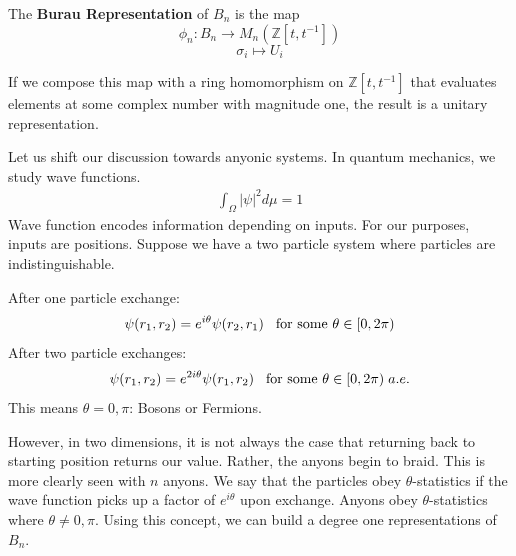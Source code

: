 \documentclass[compress,aspectratio=169,10pt,usenames,dvipsnames]{beamer}
\newcommand{\Z}{\mathbb{Z}}
\begin{document}
\begin{frame}
\vfill
\begin{definition}
	The \textbf{Burau Representation} of $B_n$ is the map 
$$\phi_n:B_n\rightarrow M_n(\Z[t,t^{-1}])$$
$$\sigma_i \mapsto U_i$$
\end{definition}
\vfill
If we compose this map with a ring homomorphism on $\Z[t,t^{-1}]$ that evaluates elements at some complex number with magnitude one, the result is a unitary representation.
\end{frame}
%
%
\begin{frame}
\vfill
Let us shift our discussion towards anyonic systems. In quantum mechanics, we study wave functions.
\vfill
\begin{equation}
	\begin{aligned}
		\int_\Omega |\psi|^2 d\mu = 1
	\end{aligned}
\end{equation}
\vfill
Wave function encodes information depending on inputs. For our purposes, inputs are positions.
\vfill 
Suppose we have a two particle system where particles are indistinguishable.
\vfill
\end{frame}


\begin{frame}
\vfill
After one particle exchange:
\begin{equation}
	\begin{aligned}
		\psi(r_1,r_2) = e^{i\theta} \psi(r_2,r_1) \hspace{3mm}\text{for some }\theta\in[0,2\pi)
	\end{aligned}
\end{equation}
\vfill
After two particle exchanges:
\begin{equation}
	\begin{aligned}
		\psi(r_1,r_2) = e^{2i\theta} \psi(r_1,r_2) \hspace{3mm}\text{for some }\theta\in[0,2\pi) \hspace{1mm} a.e.
	\end{aligned}
\end{equation}
\vfill
This means $\theta=0,\pi$: Bosons or Fermions.
\vfill
\end{frame}
%
%
\begin{frame}
\vfill
However, in two dimensions, it is not always the case that returning back to starting position returns our value. Rather, the anyons begin to braid. This is more clearly seen with $n$ anyons.
\vfill
We say that the particles obey $\theta$-statistics if the wave function picks up a factor of $e^{i\theta}$ upon exchange. Anyons obey $\theta$-statistics where $\theta\neq0,\pi$.
\vfill
Using this concept, we can build a degree one representations of $B_n$.
\end{frame}
\end{document}
